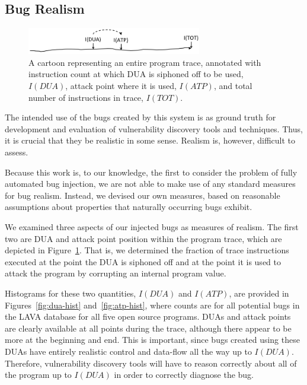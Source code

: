 \subsection{Bug Realism}


\begin{figure}
\centering
\includegraphics[width=3in]{trace-dua-atp.png}
\caption{A cartoon representing an entire program trace, annotated with instruction count at which DUA is siphoned off to be used, $I(DUA)$, attack point where it is used, $I(ATP)$, and total number of instructions in trace, $I(TOT)$.}
\label{fig:dua-atp-trace}
\end{figure}

The intended use of the bugs created by this system is as ground truth for development and evaluation of vulnerability discovery tools and techniques. 
Thus, it is crucial that they be realistic in some sense.  
Realism is, however, difficult to assess.

Because this work is, to our knowledge, the first to consider the problem of fully automated bug injection, we are not able to make use of any standard measures for bug realism.
Instead, we devised our own measures, based on reasonable assumptions about properties that naturally occurring bugs exhibit.

We examined three aspects of our injected bugs as measures of realism. 
The first two are DUA and attack point position within the program trace, which are depicted in Figure~\ref{fig:dua-atp-trace}.
That is, we determined the fraction of trace instructions executed at the point the DUA is siphoned off and at the point it is used to attack the program by corrupting an internal program value.

Histograms for these two quantities, $I(DUA)$ and $I(ATP)$, are provided in Figures~\ref{fig:dua-hist} and~\ref{fig:atp-hist}, where counts are for all potential bugs in the LAVA database for all five open source programs. 
DUAs and attack points are clearly available at all points during the trace, although there appear to be more at the beginning and end.
This is important, since bugs created using these DUAs have entirely realistic control and data-flow all the way up to $I(DUA)$.
Therefore, vulnerability discovery tools will have to reason correctly about all of the program up to $I(DUA)$ in order to correctly diagnose the bug.

